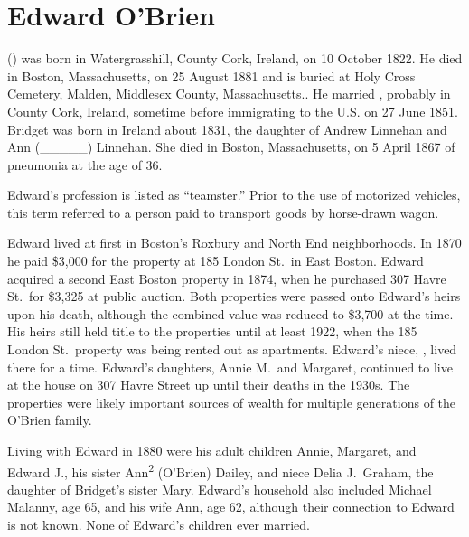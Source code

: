 \section{Edward O'Brien}

 () was born in Watergrasshill, County Cork, Ireland, on 10 October 1822.\cite{Edward2OBrienNaturalization} He died in Boston, Massachusetts, on 25 August 1881\cite{Edward2OBrienDeath} and is buried at Holy Cross Cemetery, Malden, Middlesex County, Massachusetts.\cite{CarolGordon}. He married ,\cite{Edward2OBrienMarriage} probably in County Cork, Ireland, sometime before immigrating to the U.S. on 27 June 1851.\cite{Edward2OBrienNaturalization,Edward2OBrienPetition} Bridget was born in Ireland about 1831, the daughter of Andrew Linnehan and Ann (\_\_\_\_\_) Linnehan. She died in Boston, Massachusetts, on 5 April 1867 of pneumonia at the age of 36.\cite{BridgetLinnehanDeath}

Edward's profession is listed as ``teamster.''\cite{LondonStDeed,Edward2OBrien1876} Prior to the use of motorized vehicles, this term referred to a person paid to transport goods by horse-drawn wagon.\cite{Teamster}

Edward lived at first in Boston's Roxbury\cite{MaryAnn3OBrienBirth} and North End\cite{Edward3OBrienBirth} neighborhoods. In 1870 he paid \$3,000 for the property at 185 London St.\ in East Boston.\cite{LondonStDeed,LondonStMap} Edward acquired a second East Boston property in 1874, when he purchased 307 Havre St.\ for \$3,325 at public auction.\cite{HavrePurchase,HavreMap} Both properties were passed onto Edward's heirs upon his death, although the combined value was reduced to \$3,700 at the time.\cite{Edward2OBrienProbate} His heirs still held title to the properties until at least 1922,\cite{Bromley1922} when the 185 London St.\ property was being rented out as apartments.\cite{GlobeRobbery} Edward's niece, , lived there for a time.\cite{Frances3OBrien1914} Edward's daughters, Annie M.\ and Margaret, continued to live at the house on 307 Havre Street up until their deaths in the 1930s.\cite{AnnMaria3OBrienDeath,Margaret3OBrienDeath} The properties were likely important sources of wealth for multiple generations of the O'Brien family.

Living with Edward in 1880 were his adult children Annie, Margaret, and Edward J., his sister Ann\textsuperscript{2} (O'Brien) Dailey, and niece Delia J.\ Graham, the daughter of Bridget's sister Mary. Edward's household also included Michael Malanny, age 65, and his wife Ann, age 62, although their connection to Edward is not known.\cite{Census1880Edward} None of Edward's children ever married. 

